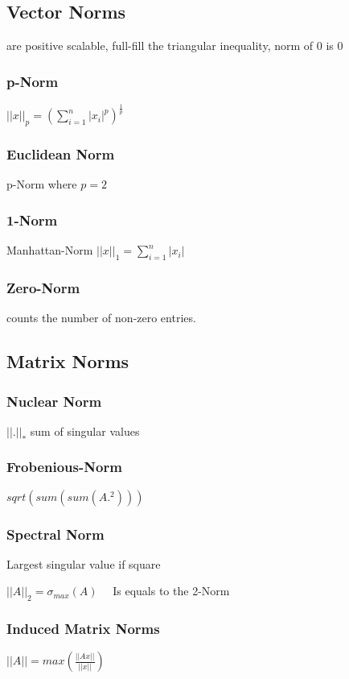 \documentclass[a4paper,11pt,twocolumn]{article}
\begin{document}
\subsection{Vector Norms}
are positive scalable, full-fill the triangular inequality, norm of 0 is 0

\subsubsection{p-Norm}
$ || x ||_p = \left( \sum_{i=1}^{n}{|x_i|^p} \right)^{\frac{1}{p}}$

\subsubsection{Euclidean Norm} 
p-Norm where $p=2$

\subsubsection{1-Norm}
Manhattan-Norm
$ ||x||_1 = \sum_{i=1}^{n}{|x_i|} $

\subsubsection{Zero-Norm} 
counts the number of non-zero entries.

\subsection{Matrix Norms}

\subsubsection{Nuclear Norm}

$|| . ||_*$ sum of singular values

\subsubsection{Frobenious-Norm}
$sqrt(sum(sum(A.^2)))$

\subsubsection{Spectral Norm} 
Largest singular value if square 

$||A||_2 = \sigma_{max}(A)$ 
~~Is equals to the 2-Norm

\subsubsection{Induced Matrix Norms}
$ ||A|| = max \left( \frac{ ||Ax|| }{ ||x|| } \right)$
\end{document}
